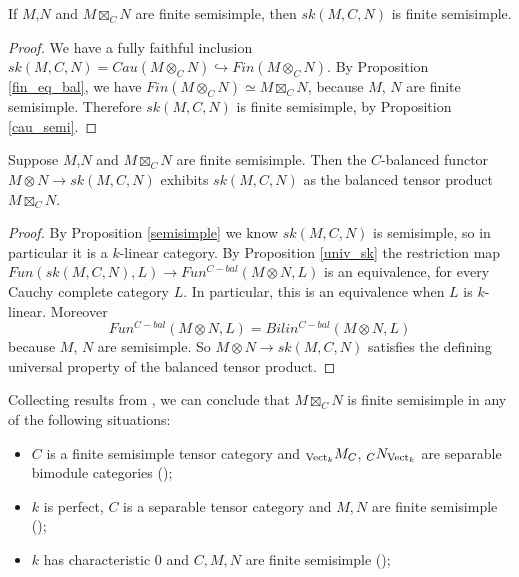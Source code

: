 \begin{proposition}\label{semisimple}

If $M$,$N$ and $M\boxtimes_C N$ are finite semisimple, then $sk(M,C,N)$ is finite semisimple.\end{proposition}

\begin{proof}

We have a fully faithful inclusion $sk(M,C,N)=Cau(M\otimes_C N)\hookrightarrow Fin(M\otimes_C N)$. By Proposition \ref{fin_eq_bal}, we have $Fin(M\otimes_C N)\simeq M\boxtimes_C N$, because $M$, $N$ are finite semisimple. Therefore $sk(M,C,N)$ is finite semisimple, by Proposition \ref{cau_semi}.\end{proof}

\begin{theorem}\label{sk_bal}

Suppose $M$,$N$ and $M\boxtimes_C N$ are finite semisimple. Then the $C$-balanced functor $M\otimes N\to sk(M,C,N)$ exhibits $sk(M,C,N)$ as the balanced tensor product $M\boxtimes_C N$.\end{theorem}
\begin{proof}

By Proposition \ref{semisimple} we know $sk(M,C,N)$ is semisimple, so in particular it is a $k$-linear category. By Proposition \ref{univ_sk} the restriction map $Fun(sk(M,C,N),L)\to Fun^{C-bal}(M\otimes N,L)$ is an equivalence, for every Cauchy complete category $L$. In particular, this is an equivalence when $L$ is $k$-linear. Moreover $$Fun^{C-bal}(M\otimes N, L)=Bilin^{C-bal}(M\otimes N, L)$$ because $M$, $N$ are semisimple. So $M\otimes N\to sk(M,C,N)$ satisfies the defining universal property of the balanced tensor product.\end{proof}


\begin{remark}\label{semisimple_douglas/dualizable-tensor-categories}

Collecting results from \cite{douglas/dualizable-tensor-categories}, we can conclude that $M\boxtimes_C N$ is finite semisimple in any of the following situations:

\begin{itemize}
 \item $C$ is a finite semisimple tensor category and $_{\operatorname{Vect}_k}M_C$, $_{C}N_{\operatorname{Vect}_k}$ are separable bimodule categories (\cite[Proposition 2.5.3, Theorem 2.5.5]{douglas/dualizable-tensor-categories});
 \item $k$ is perfect, $C$ is a separable tensor category and $M,N$ are finite semisimple (\cite[Proposition 2.5.10]{douglas/dualizable-tensor-categories});
 \item $k$ has characteristic $0$ and $C,M,N$ are finite semisimple (\cite[Corollary 2.6.9]{douglas/dualizable-tensor-categories});
\end{itemize}

\end{remark}

